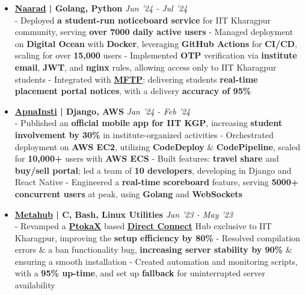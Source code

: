 \documentclass[a4paper,10pt]{extarticle} %
\begin{document}
\begin{itemize}[leftmargin=0.55cm, rightmargin=0.2cm, label={\Large\textbullet}]

 \item \textbf{\href{https://naarad.metakgp.org}{Naarad} | Golang, Python} \hfill{\textit{Jun '24 - Jul '24}} \\
- Deployed \textbf{a student-run noticeboard service} for IIT Kharagpur community, serving \textbf{over 7000 daily active users} \newline
- Managed deployment on \textbf{Digital Ocean} with \textbf{Docker}, leveraging \textbf{GitHub Actions} for \textbf{CI/CD}, scaling for over \textbf{15,000} users \newline
- Implemented \textbf{OTP} verification via \textbf{institute email}, \textbf{JWT}, and \textbf{nginx} rules, allowing access only to IIT Kharagpur students \newline
- Integrated with \href{https://github.com/metakgp/mftp}{\textbf{MFTP}}: delivering students \textbf{real-time placement portal notices}, with a delivery \textbf{accuracy of 95\%}

 \item \textbf{{\href{https://play.google.com/store/apps/details?id=com.apnainsti&pli=1}{ApnaInsti}} | Django, AWS} \hfill{\textit{Jan '24 - Feb '24}} \\
- Published an \textbf{official mobile app for IIT KGP}, increasing \textbf{student involvement by 30\%} in institute-organized activities \newline
- Orchestrated deployment on \textbf{AWS EC2}, utilizing \textbf{CodeDeploy} \& \textbf{CodePipeline}, scaled for \textbf{10,000+} users with \textbf{AWS ECS} \newline
- Built features: \textbf{travel share} and \textbf{buy/sell portal}; led a team of \textbf{10 developers}, developing in Django and React Native \newline
- Engineered a \textbf{real-time scoreboard} feature, serving \textbf{5000+ concurrent users} at peak, using \textbf{Golang} and \textbf{WebSockets}

\item \textbf{{\href{https://github.com/proffapt/Metahub}{Metahub}} | C, Bash, Linux Utilities} \hfill{\textit{Jan '23 - May '23}} \\
- Revamped a \href{http://www.ptokax.org/}{\textbf{PtokaX}} based \href{https://en.wikipedia.org/wiki/Direct_Connect_(protocol)}{\textbf{Direct Connect}} Hub exclusive to IIT Kharagpur, improving the \textbf{setup efficiency by 80\%} \newline
- Resolved compilation errors \& a ban functionality bug, \textbf{increasing server stability by 90\%} \& ensuring a smooth installation \newline
- Created automation and monitoring scripts, with a \textbf{95\% up-time}, and set up \textbf{fallback} for uninterrupted server availability


\end{itemize}
\end{document}
